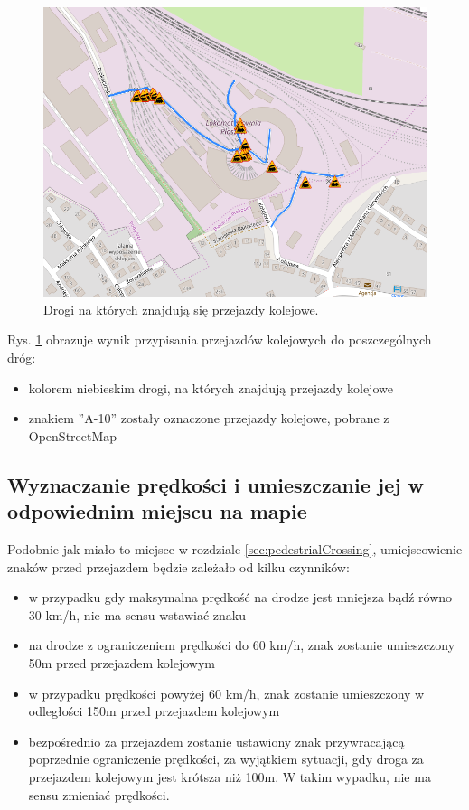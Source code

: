 \begin{figure}[h]
\caption{Drogi na których znajdują się przejazdy kolejowe.}
\label{sec:PrzejazdyKolejowe}
\centering
\includegraphics[width=1.0\textwidth]{railCrossing}
\end{figure}

Rys. \ref{sec:PrzejazdyKolejowe} obrazuje wynik przypisania przejazdów kolejowych do poszczególnych dróg:
\begin{itemize}
\item kolorem niebieskim drogi, na których znajdują przejazdy kolejowe
\item znakiem ''A-10'' zostały oznaczone przejazdy kolejowe, pobrane z OpenStreetMap
\end{itemize}

\newpage
\subsection{Wyznaczanie prędkości i umieszczanie jej w odpowiednim miejscu na mapie}

Podobnie jak miało to miejsce w rozdziale \ref{sec:pedestrialCrossing}, umiejscowienie znaków przed przejazdem będzie zależało od kilku czynników:
\begin{itemize}
\item w przypadku gdy maksymalna prędkość na drodze jest mniejsza bądź równo 30 km/h, nie ma sensu wstawiać znaku
\item na  drodze z ograniczeniem prędkości do 60 km/h, znak zostanie umieszczony 50m przed przejazdem kolejowym
\item w przypadku prędkości powyżej 60 km/h, znak zostanie umieszczony w odległości 150m przed przejazdem kolejowym
\item bezpośrednio za przejazdem zostanie ustawiony znak przywracającą poprzednie ograniczenie prędkości, za wyjątkiem sytuacji, gdy droga za przejazdem kolejowym jest krótsza niż 100m. W takim wypadku, nie ma sensu zmieniać prędkości.
\end{itemize}

